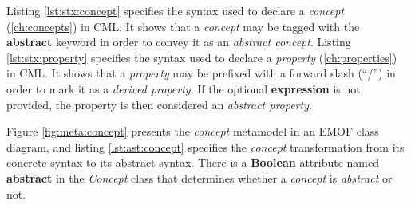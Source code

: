 Listing \ref{lst:stx:concept} specifies the syntax used
to declare a \emph{concept} (\ref{ch:concepts}) in CML.
It shows that a \emph{concept} may be tagged with the \textbf{abstract} keyword
in order to convey it as an \emph{abstract concept}.
Listing \ref{lst:stx:property} specifies the syntax used
to declare a \emph{property} (\ref{ch:properties}) in CML.
It shows that a \emph{property} may be prefixed with a forward slash (``/'')
in order to mark it as a \emph{derived property}.
If the optional \textbf{expression} is not provided,
the property is then considered an \emph{abstract property}.

Figure \ref{fig:meta:concept} presents the \emph{concept} metamodel
in an EMOF \cite{mof} class diagram,
and listing \ref{lst:ast:concept} specifies
the \emph{concept} transformation
from its concrete syntax to its abstract syntax.
There is a \textbf{Boolean} attribute named \textbf{abstract} in the \emph{Concept} class
that determines whether a \emph{concept} is \emph{abstract} or not.
